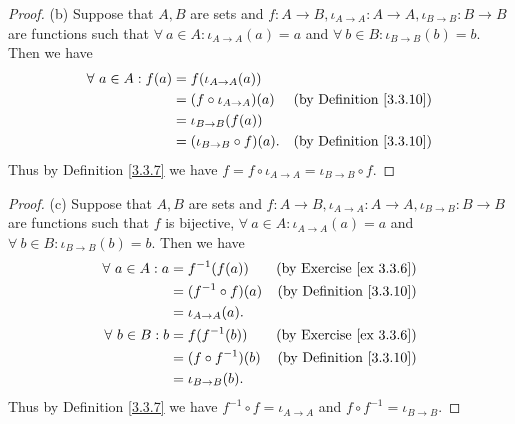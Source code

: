 \begin{proof}{(b)}
    Suppose that \(A, B\) are sets and \(f : A \to B, \iota_{A \to A} : A \to A, \iota_{B \to B} : B \to B\) are functions such that \(\forall\ a \in A : \iota_{A \to A}(a) = a\) and \(\forall\ b \in B : \iota_{B \to B}(b) = b\).
    Then we have
    \begin{align*}
        \forall\ a \in A : f(a) & = f(\iota_{A \to A}(a))                                               \\
                                & = (f \circ \iota_{A \to A})(a)  & \text{(by Definition \ref{3.3.10})} \\
                                & = \iota_{B \to B}(f(a))                                               \\
                                & = (\iota_{B \to B} \circ f)(a). & \text{(by Definition \ref{3.3.10})}
    \end{align*}
    Thus by Definition \ref{3.3.7} we have \(f = f \circ \iota_{A \to A} = \iota_{B \to B} \circ f\).
\end{proof}

\begin{proof}{(c)}
    Suppose that \(A, B\) are sets and \(f : A \to B, \iota_{A \to A} : A \to A, \iota_{B \to B} : B \to B\) are functions such that \(f\) is bijective, \(\forall\ a \in A : \iota_{A \to A}(a) = a\) and \(\forall\ b \in B : \iota_{B \to B}(b) = b\).
    Then we have
    \begin{align*}
        \forall\ a \in A : a & = f^{-1}(f(a))        & \text{(by Exercise \ref{ex 3.3.6})} \\
                             & = (f^{-1} \circ f)(a) & \text{(by Definition \ref{3.3.10})} \\
                             & = \iota_{A \to A}(a).                                       \\
        \forall\ b \in B : b & = f(f^{-1}(b))        & \text{(by Exercise \ref{ex 3.3.6})} \\
                             & = (f \circ f^{-1})(b) & \text{(by Definition \ref{3.3.10})} \\
                             & = \iota_{B \to B}(b).
    \end{align*}
    Thus by Definition \ref{3.3.7} we have \(f^{-1} \circ f = \iota_{A \to A}\) and \(f \circ f^{-1} = \iota_{B \to B}\).
\end{proof}


